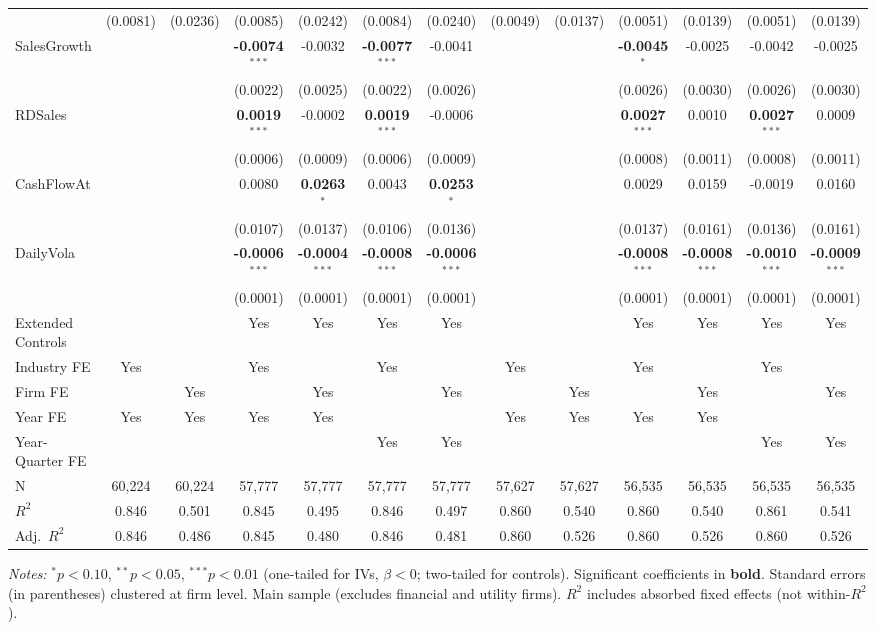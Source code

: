 \documentclass[11pt,a4paper]{article}
\begin{document}
\begin{table}[htbp]
\begin{tabular}{lcccccccccccc}
 & (0.0081) & (0.0236) & (0.0085) & (0.0242) & (0.0084) & (0.0240) & (0.0049) & (0.0137) & (0.0051) & (0.0139) & (0.0051) & (0.0139) \\
SalesGrowth &  &  & \textbf{-0.0074}$^{***}$ & -0.0032 & \textbf{-0.0077}$^{***}$ & -0.0041 &  &  & \textbf{-0.0045}$^{*}$ & -0.0025 & -0.0042 & -0.0025 \\
 &  &  & (0.0022) & (0.0025) & (0.0022) & (0.0026) &  &  & (0.0026) & (0.0030) & (0.0026) & (0.0030) \\
RDSales &  &  & \textbf{0.0019}$^{***}$ & -0.0002 & \textbf{0.0019}$^{***}$ & -0.0006 &  &  & \textbf{0.0027}$^{***}$ & 0.0010 & \textbf{0.0027}$^{***}$ & 0.0009 \\
 &  &  & (0.0006) & (0.0009) & (0.0006) & (0.0009) &  &  & (0.0008) & (0.0011) & (0.0008) & (0.0011) \\
CashFlowAt &  &  & 0.0080 & \textbf{0.0263}$^{*}$ & 0.0043 & \textbf{0.0253}$^{*}$ &  &  & 0.0029 & 0.0159 & -0.0019 & 0.0160 \\
 &  &  & (0.0107) & (0.0137) & (0.0106) & (0.0136) &  &  & (0.0137) & (0.0161) & (0.0136) & (0.0161) \\
DailyVola &  &  & \textbf{-0.0006}$^{***}$ & \textbf{-0.0004}$^{***}$ & \textbf{-0.0008}$^{***}$ & \textbf{-0.0006}$^{***}$ &  &  & \textbf{-0.0008}$^{***}$ & \textbf{-0.0008}$^{***}$ & \textbf{-0.0010}$^{***}$ & \textbf{-0.0009}$^{***}$ \\
 &  &  & (0.0001) & (0.0001) & (0.0001) & (0.0001) &  &  & (0.0001) & (0.0001) & (0.0001) & (0.0001) \\
\midrule
Extended Controls &  &  & Yes & Yes & Yes & Yes &  &  & Yes & Yes & Yes & Yes \\
Industry FE & Yes &  & Yes &  & Yes &  & Yes &  & Yes &  & Yes &  \\
Firm FE &  & Yes &  & Yes &  & Yes &  & Yes &  & Yes &  & Yes \\
Year FE & Yes & Yes & Yes & Yes &  &  & Yes & Yes & Yes & Yes &  &  \\
Year-Quarter FE &  &  &  &  & Yes & Yes &  &  &  &  & Yes & Yes \\
\midrule
N & 60,224 & 60,224 & 57,777 & 57,777 & 57,777 & 57,777 & 57,627 & 57,627 & 56,535 & 56,535 & 56,535 & 56,535 \\
$R^2$ & 0.846 & 0.501 & 0.845 & 0.495 & 0.846 & 0.497 & 0.860 & 0.540 & 0.860 & 0.540 & 0.861 & 0.541 \\
Adj.~$R^2$ & 0.846 & 0.486 & 0.845 & 0.480 & 0.846 & 0.481 & 0.860 & 0.526 & 0.860 & 0.526 & 0.860 & 0.526 \\
\bottomrule
\end{tabular}
\begin{minipage}{\linewidth}
\vspace{2pt}\scriptsize
\textit{Notes:} $^{*}p<0.10$, $^{**}p<0.05$, $^{***}p<0.01$ (one-tailed for IVs, $\beta < 0$; two-tailed for controls).
 Significant coefficients in \textbf{bold}.
 Standard errors (in parentheses) clustered at firm level.
 Main sample (excludes financial and utility firms).
 $R^2$ includes absorbed fixed effects (not within-$R^2$).
\end{minipage}
\end{table}
\end{document}
